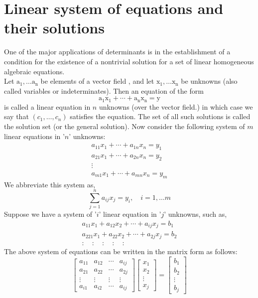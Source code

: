 \section{Linear system of equations and  their solutions}
One of the major applications of determinants is in the establishment of a condition for the existence of a nontrivial solution for a set of linear homogeneous algebraic equations.\\
Let $\mathrm{a}_{1}, \ldots \mathrm{a}_{\mathrm{n}}$ be elements of a vector  field , and let $\mathrm{x}_{1}, \ldots \mathrm{x}_{\mathrm{n}}$ be unknowns
(also called variables or indeterminates). Then an equation of the form
$$
\mathrm{a}_{1} \mathrm{x}_{1}+\cdots+\mathrm{a}_{\mathrm{n}} \mathrm{x}_{\mathrm{n}}=\mathrm{y}
$$
is called a linear equation in $n$ unknowns (over the vector field.)
in which case we say that $\left(c_{1}, \ldots, c_{n}\right)$ satisfies the equation. The set of all such solutions is called the solution set (or the general solution).
Now consider the following system of ${m}$ linear equations in '${n}$' unknowns:
$$
\begin{array}{c}
	a_{11} x_{1}+\cdots+a_{1 n} x_{n}=y_{1} \\
	a_{21} x_{1}+\cdots+a_{2 n} x_{n}=y_{2} \\
	\vdots \\
	a_{m 1} x_{1}+\cdots+a_{m n} x_{n}=y_{m}
\end{array}
$$
We abbreviate this system as,
$$
\sum_{j=1}^{n} a_{i j} x_{j}=y_{i}, \quad i=1, \ldots m
$$
Suppose we have a system of '$ i $' linear equation in '$ j $' unknowns, such as,
$$
\begin{array}{c}
	a_{11} x_{1}+a_{12} x_{2}+\cdots+a_{i j} x_{j}=b_{1} \\
	a_{221} x_{1}+a_{22} x_{2}+\cdots+a_{2 j} x_{j}=b_{2} \\
	: \quad: \quad: \quad: \quad:
\end{array}
$$
The above system of equations can be written in the matrix form as follows:
$$
\left[\begin{array}{cccc}
	a_{11} & a_{12} & \cdots & a_{i j} \\
	a_{21} & a_{22} & \cdots & a_{2 j} \\
	\vdots & \vdots & \vdots & \vdots \\
	a_{i 1} & a_{i 2} & \cdots & a_{i j}
\end{array}\right]\left[\begin{array}{c}
	x_{1} \\
	x_{2} \\
	\vdots \\
	x_{j}
\end{array}\right]=\left[\begin{array}{c}
	b_{1} \\
	b_{2} \\
	\vdots \\
	b_{j}
\end{array}\right]
$$
